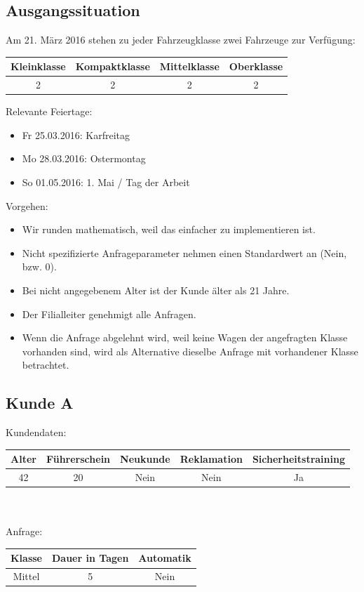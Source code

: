 \subsection{Ausgangssituation}

Am 21. März 2016 stehen zu jeder Fahrzeugklasse zwei Fahrzeuge zur Verfügung:

\begin{tabular}{|c|c|c|c|}
	\hline \textbf{Kleinklasse} & \textbf{Kompaktklasse} & \textbf{Mittelklasse} & \textbf{Oberklasse}  \\ 
	\hline 2 & 2 & 2 & 2 \\ 
	\hline 
\end{tabular} 

Relevante Feiertage:
\begin{itemize}
	\item Fr 25.03.2016: Karfreitag
	\item Mo 28.03.2016: Ostermontag
	\item So 01.05.2016: 1. Mai / Tag der Arbeit
\end{itemize}

Vorgehen:
\begin{itemize}
	\item Wir runden mathematisch, weil das einfacher zu implementieren ist.
	\item Nicht spezifizierte Anfrageparameter nehmen einen Standardwert an (Nein, bzw. 0).
	\item Bei nicht angegebenem Alter ist der Kunde älter als 21 Jahre.
	\item Der Filialleiter genehmigt alle Anfragen.
	\item Wenn die Anfrage abgelehnt wird, weil keine Wagen der angefragten Klasse vorhanden sind,
	wird als Alternative dieselbe Anfrage mit vorhandener Klasse betrachtet.
\end{itemize}

\subsection{Kunde A}

Kundendaten:\\
\begin{tabular}{|c|c|c|c|c|}
	\hline \textbf{Alter} & \textbf{Führerschein} & \textbf{Neukunde} & \textbf{Reklamation} & \textbf{Sicherheitstraining} \\ 
	\hline 42 & 20 & Nein & Nein & Ja \\ 
	\hline 
\end{tabular} 
\\\\
Anfrage:\\
\begin{tabular}{|c|c|c|}
	\hline \textbf{Klasse} & \textbf{Dauer in Tagen} & \textbf{Automatik} \\ 
	\hline Mittel & 5 & Nein \\ 
	\hline 
\end{tabular}


